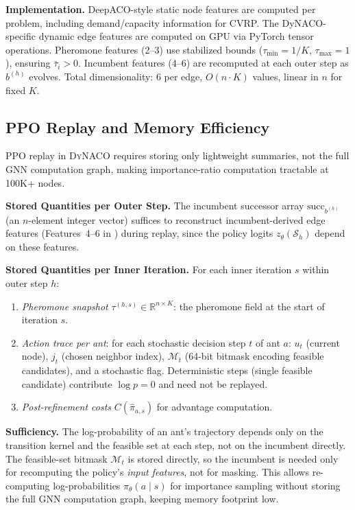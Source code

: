 \documentclass[sigconf,nonacm]{acmart}
\newcommand{\DyNACO}{\textsc{DyNACO}}
\begin{document}
\textbf{Implementation.}
DeepACO-style static node features are computed per problem, including demand/capacity information for CVRP. The DyNACO-specific dynamic edge features are computed on GPU via PyTorch tensor operations.
Pheromone features (2--3) use stabilized bounds ($\tau_{\min}=1/K$, $\tau_{\max}=1$), ensuring $\bar{\tau}_i > 0$.
Incumbent features (4--6) are recomputed at each outer step as $b^{(h)}$ evolves.
Total dimensionality: 6 per edge, $O(n \cdot K)$ values, linear in $n$ for fixed $K$.



\subsection{PPO Replay and Memory Efficiency}
\label{app:ppo-replay}

PPO replay in \DyNACO{} requires storing only lightweight summaries, not the full GNN computation graph, making importance-ratio computation tractable at 100K+ nodes.

\textbf{Stored Quantities per Outer Step.}
The incumbent successor array $\mathrm{succ}_{b^{(h)}}$ (an $n$-element integer vector) suffices to reconstruct incumbent-derived edge features (Features~4--6 in ) during replay, since the policy logits $z_\theta(\mathcal{S}_h)$ depend on these features.

\textbf{Stored Quantities per Inner Iteration.}
For each inner iteration $s$ within outer step $h$:
\begin{enumerate}
\item \emph{Pheromone snapshot} $\tau^{(h,s)} \in \mathbb{R}^{n \times K}$: the pheromone field at the start of iteration $s$.
\item \emph{Action trace per ant}: for each stochastic decision step $t$ of ant $a$:
  $u_t$ (current node), $j_t$ (chosen neighbor index), $\mathcal{M}_t$ (64-bit bitmask encoding feasible candidates), and a stochastic flag.
  Deterministic steps (single feasible candidate) contribute $\log p = 0$ and need not be replayed.
\item \emph{Post-refinement costs} $C(\hat{\pi}_{a,s})$ for advantage computation.
\end{enumerate}

\textbf{Sufficiency.}
The log-probability of an ant's trajectory depends only on the transition kernel and the feasible set at each step, not on the incumbent directly.
The feasible-set bitmask $\mathcal{M}_t$ is stored directly, so the incumbent is needed only for recomputing the policy's \emph{input features}, not for masking.
This allows re-computing log-probabilities $\pi_\theta(a \mid s)$ for importance sampling without storing the full GNN computation graph, keeping memory footprint low.
\end{document}
